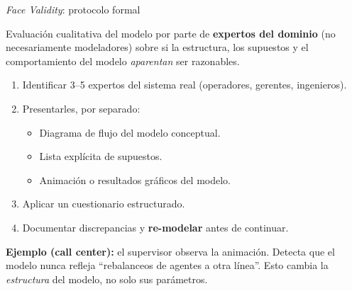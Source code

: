 \documentclass[aspectratio=1610, 10pt]{beamer}
\begin{document}
\begin{frame}{\emph{Face Validity}: protocolo formal}
  \begin{definicionbox}
    \footnotesize
    Evaluación cualitativa del modelo por parte de \textbf{expertos del dominio}
    (no necesariamente modeladores) sobre si la estructura, los supuestos y el
    comportamiento del modelo \emph{aparentan} ser razonables.
  \end{definicionbox}

  \vspace{4pt}
  \begin{metodobox}
    \footnotesize
    \begin{enumerate}\itemsep1pt
      \item Identificar 3--5 expertos del sistema real (operadores, gerentes, ingenieros).
      \item Presentarles, por separado:
        \begin{itemize}\scriptsize\itemsep0pt
          \item Diagrama de flujo del modelo conceptual.
          \item Lista explícita de supuestos.
          \item Animación o resultados gráficos del modelo.
        \end{itemize}
      \item Aplicar un cuestionario estructurado.
      \item Documentar discrepancias y \textbf{re-modelar} antes de continuar.
    \end{enumerate}
  \end{metodobox}

  \vspace{4pt}
  \footnotesize
  \textbf{Ejemplo (call center):} el supervisor observa la animación. Detecta que
  el modelo nunca refleja ``rebalanceos de agentes a otra línea''. Esto cambia
  la \emph{estructura} del modelo, no solo sus parámetros.
\end{frame}
\end{document}
